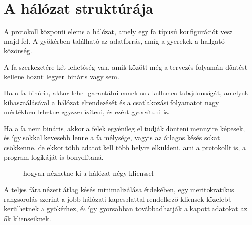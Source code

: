 \chapter{A h\'al\'ozat strukt\'ur\'aja}

A protokoll központi eleme a hálózat, amely egy fa típusú konfigurációt
vesz majd fel. A gyökérben található az adatforrás, amíg a gyerekek a
hallgató közönség.

A fa szerkezetére két lehetőség van, amik között még a tervezés folyamán
döntést kellene hozni: legyen bináris vagy sem.

Ha a fa bináris, akkor lehet garantálni ennek sok kellemes tulajdonságát,
amelyek kihasználásával a hálózat elrendezését és a csatlakozási
folyamatot nagy mértékben lehetne egyszerűsíteni, és ezért gyorsítani is.

Ha a fa nem bináris, akkor a felek egyénileg el tudják dönteni mennyire
képesek, és így sokkal kevesebb lenne a fa mélysége, vagyis az átlagos
késés sokat csökkenne, de ekkor több adatot kell több helyre elküldeni,
ami a protokollt is, a program logikáját is bonyolítaná.

\begin{figure}

\caption{hogyan nézhetne ki a hálózat négy klienssel}
\end{figure}

A teljes fára nézett átlag késés minimalizálása érdekében, egy
meritokratikus rangsorolás szerint a jobb hálózati kapcsolattal
rendelkező kliensek közelebb kerülhetnek a gyökérhez, és így gyorsabban
továbbadhatják a kapott adatokat az ők klienseiknek.
